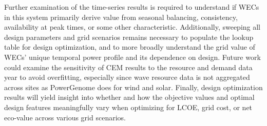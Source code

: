 \documentclass[10pt,twoside]{article}
\begin{document}
Further examination of the time-series results is required to understand if WECs in this system primarily derive value from seasonal balancing, consistency, availability at peak times, or some other characteristic.
Additionally, sweeping all design parameters and grid scenarios remains necessary to populate the lookup table for design optimization, and to more broadly understand the grid value of WECs' unique temporal power profile and its dependence on design.
Future work could examine the sensitivity of CEM results to the resource and demand data year to avoid overfitting, especially since wave resource data is not aggregated across sites as PowerGenome does for wind and solar.
Finally, design optimization results will yield insight into whether and how the objective values and optimal design features meaningfully vary when optimizing for LCOE, grid cost, or net eco-value across various grid scenarios.

\end{document}

